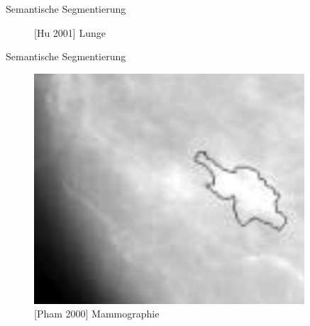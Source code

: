 \begin{frame}{Semantische Segmentierung}
\begin{figure}[ht]
\begin{minipage}[b]{0.45\linewidth}
            \caption{[Hu 2001] Lunge}
            \label{fig:lung}
        \end{minipage}
    \end{figure}
\end{frame}

\begin{frame}{Semantische Segmentierung}
    \begin{figure}[ht]
        \begin{minipage}[b]{0.45\linewidth}
            \centering
            \includegraphics[width=\textwidth]{../images/mammography.png}
            \caption{[Pham 2000] Mammographie}
            \label{fig:mammographie}
        \end{minipage}
        \hspace{0.5cm}
        \begin{minipage}[b]{0.45\linewidth}
            \centering

\end{minipage}
\end{figure}
\end{frame}
